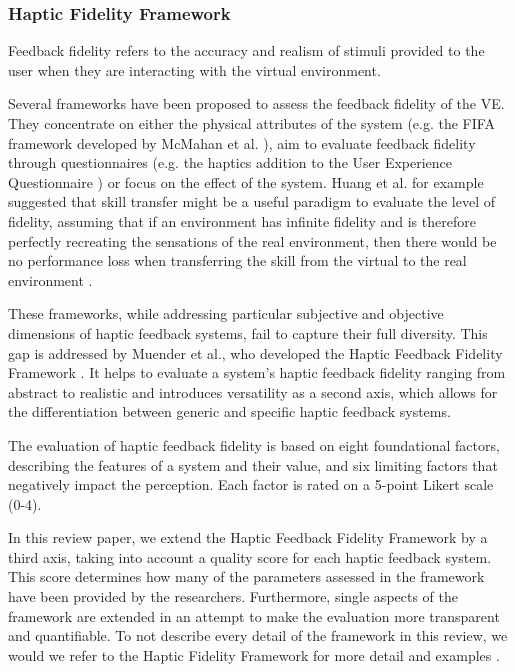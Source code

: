 \subsubsection{Haptic Fidelity Framework}

Feedback fidelity refers to the accuracy and realism of stimuli provided to the user when they are interacting with the virtual environment. 

Several frameworks have been proposed to assess the feedback fidelity of the VE. They concentrate on either the physical attributes of the system (e.g. the FIFA framework developed by McMahan et al. \cite{McMahan2011ExploringGames}), aim to evaluate feedback fidelity through questionnaires (e.g. the haptics addition \cite{Boos2017ErweiterungHaptik} to the User Experience Questionnaire \cite{Laugwitz2008ConstructionQuestionnaire}) or focus on the effect of the system. Huang et al. for example suggested that skill transfer might be a useful paradigm to evaluate the level of fidelity, assuming that if an environment has infinite fidelity and is therefore perfectly recreating the sensations of the real environment, then there would be no performance loss when transferring the skill from the virtual to the real environment \cite{Huang2006}.

These frameworks, while addressing particular subjective and objective dimensions of haptic feedback systems, fail to capture their full diversity. This gap is addressed by Muender et al., who developed the Haptic Feedback Fidelity Framework \cite{Muender2022HapticReality}. It helps to evaluate a system's haptic feedback fidelity ranging from abstract to realistic and introduces versatility as a second axis, which allows for the differentiation between generic and specific haptic feedback systems. 

The evaluation of haptic feedback fidelity is based on eight foundational factors, describing the features of a system and their value, and six limiting factors that negatively impact the perception. Each factor is rated on a 5-point Likert scale (0-4). 

In this review paper, we extend the Haptic Feedback Fidelity Framework by a third axis, taking into account a quality score for each haptic feedback system. This score determines how many of the parameters assessed in the framework have been provided by the researchers. Furthermore, single aspects of the framework are extended in an attempt to make the evaluation more transparent and quantifiable. 
To not describe every detail of the framework in this review, we would we refer to the Haptic Fidelity Framework for more detail and examples \cite{Muender2022HapticReality}.

